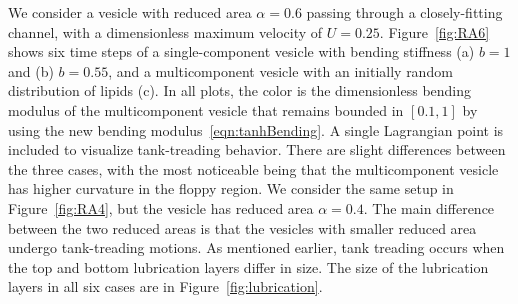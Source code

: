 \documentclass[twoside,twocolumn,9pt]{article}
\newcommand{\subfigimg}[3][,]{%
  \setbox1=\hbox{\texttt{[image: \#3]}}%
  \leavevmode\rlap{\usebox1}%
  \rlap{\hspace*{0pt}\raisebox{\dimexpr\ht1-0\baselineskip}{\bf
  \normalsize #2}}%
  \phantom{\usebox1}%
}
\begin{document}

We consider a vesicle with reduced area $\alpha = 0.6$ passing through a
closely-fitting channel, with a dimensionless maximum velocity of $U =
0.25$. Figure~\ref{fig:RA6} shows six time steps of a single-component
vesicle with bending stiffness (a) $b=1$ and (b) $b=0.55$, and a
multicomponent vesicle with an initially random distribution of lipids
(c). In all plots, the color is the dimensionless bending modulus of the
multicomponent vesicle that remains bounded in $[0.1,1]$ by using the
new bending modulus~\eqref{eqn:tanhBending}. A single Lagrangian point
is included to visualize tank-treading behavior. There are slight
differences between the three cases, with the most noticeable being that
the multicomponent vesicle has higher curvature in the floppy region. We
consider the same setup in Figure~\ref{fig:RA4}, but the vesicle has
reduced area $\alpha = 0.4$. The main difference between the two reduced
areas is that the vesicles with smaller reduced area undergo
tank-treading motions. As mentioned earlier, tank treading occurs when
the top and bottom lubrication layers differ in size. The size of the
lubrication layers in all six cases are in Figure~\ref{fig:lubrication}. 
\end{document}
